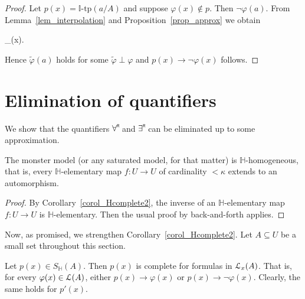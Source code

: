 \documentclass[11pt,oneside]{amsart}
\begin{document}
 \begin{proof}
  Let $p(x)=\mathds{I}\mbox{-tp}(a/A)$ and suppose $\varphi(x)\notin p$.
  Then $\neg\varphi(a)$.
  From Lemma~\ref{lem_interpolation} and Proposition~\ref{prop_approx} we obtain

  {\rightarrow}
  {\bigvee_{\tilde{\varphi}\perp\varphi}\tilde{\varphi}(x).}

  Hence $\tilde{\varphi}(a)$ holds for some $\tilde{\varphi}\perp\varphi$ and $p(x)\rightarrow\neg\varphi(x)$ follows.
 \end{proof}








\section{Elimination of quantifiers}

We show that the quantifiers $\forallR $ and $\existsR $ can be eliminated up to some approximation.

\begin{proposition}
  The monster model (or any saturated model, for that matter) is $\mathds{H}$-homogeneous, that is, every $\mathds{H}$-elementary map $f:U\to U$ of cardinality $<\kappa$ extends to an automorphism.
\end{proposition}

\begin{proof}
  By Corollary~\ref{corol_Hcomplete2}, the inverse of an $\mathds{H}$-elementary map $f:U\to U$ is $\mathds{H}$-elementary.
  Then the usual proof by back-and-forth applies.
\end{proof}

Now, as promised, we strengthen Corollary~\ref{corol_Hcomplete2}.
Let $A\subseteq U$ be a small set throughout this section.

\begin{corollary}\label{corol_Lcomplete}
  Let $p(x)\in S_\mathds{H}(A)$.
  Then $p(x)$ is complete for formulas in ${\EuScript L}_x(A)$.
  That is, for every $\varphi(x)\in{\EuScript L}(A)$, either $p(x)\rightarrow\varphi(x)$ or $p(x)\rightarrow\neg\varphi(x)$.
  Clearly, the same holds for $p'(x)$.
\end{corollary}
\end{document}
